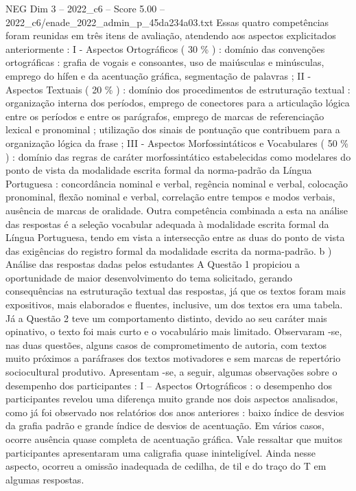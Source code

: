 \begin{textsample}{NEG Dim 3 – 2022\_c6 – Score 5.00 – 2022\_c6/enade\_2022\_admin\_p\_45da234a03.txt}
Essas quatro competências foram reunidas em três itens de avaliação, atendendo aos aspectos explicitados anteriormente : I - Aspectos Ortográficos ( 30 \% ) : domínio das convenções ortográficas : grafia de vogais e consoantes, uso de maiúsculas e minúsculas, emprego do hífen e da acentuação gráfica, segmentação de palavras ; II - Aspectos Textuais ( 20 \% ) : domínio dos procedimentos de estruturação textual : organização interna dos períodos, emprego de conectores para a articulação lógica entre os períodos e entre os parágrafos, emprego de marcas de referenciação lexical e pronominal ; utilização dos sinais de pontuação que contribuem para a organização lógica da frase ; III - Aspectos Morfossintáticos e Vocabulares ( 50 \% ) : domínio das regras de caráter morfossintático estabelecidas como modelares do ponto de vista da modalidade escrita formal da norma-padrão da Língua Portuguesa : concordância nominal e verbal, regência nominal e verbal, colocação pronominal, flexão nominal e verbal, correlação entre tempos e modos verbais, ausência de marcas de oralidade.
Outra competência combinada a esta na análise das respostas é a seleção vocabular adequada à modalidade escrita formal da Língua Portuguesa, tendo em vista a intersecção entre as duas do ponto de vista das exigências do registro formal da modalidade escrita da norma-padrão. b ) Análise das respostas dadas pelos estudantes A Questão 1 propiciou a oportunidade de maior desenvolvimento do tema solicitado, gerando consequências na estruturação textual das respostas, já que os textos foram mais expositivos, mais elaborados e fluentes, inclusive, um dos textos era uma tabela.
Já a Questão 2 teve um comportamento distinto, devido ao seu caráter mais opinativo, o texto foi mais curto e o vocabulário mais limitado.
Observaram -se, nas duas questões, alguns casos de comprometimento de autoria, com textos muito próximos a paráfrases dos textos motivadores e sem marcas de repertório sociocultural produtivo.
Apresentam -se, a seguir, algumas observações sobre o desempenho dos participantes : I – Aspectos Ortográficos : o desempenho dos participantes revelou uma diferença muito grande nos dois aspectos analisados, como já foi observado nos relatórios dos anos anteriores : baixo índice de desvios da grafia padrão e grande índice de desvios de acentuação.
Em vários casos, ocorre ausência quase completa de acentuação gráfica.
Vale ressaltar que muitos participantes apresentaram uma caligrafia quase ininteligível.
Ainda nesse aspecto, ocorreu a omissão inadequada de cedilha, de til e do traço do T em algumas respostas.

\end{textsample}
